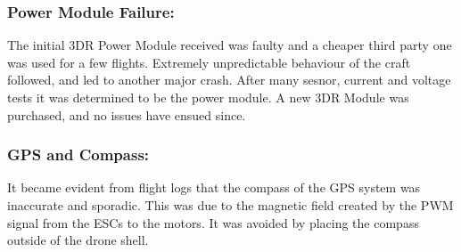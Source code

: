 \subsubsection*{Power Module Failure:}  The initial 3DR Power Module received was faulty and a cheaper third party one was used for a few flights. Extremely unpredictable behaviour of the craft followed, and led to another major crash. After many sesnor, current and voltage tests it was determined to be the power module. A new 3DR Module was purchased, and no issues have ensued since.  
\subsubsection*{GPS and Compass:}  It became evident from flight logs that the compass of the GPS system was inaccurate and sporadic. This was due to the magnetic field created by the PWM signal from the ESCs to the motors. It was avoided by placing the compass outside of the drone shell.\\\\
